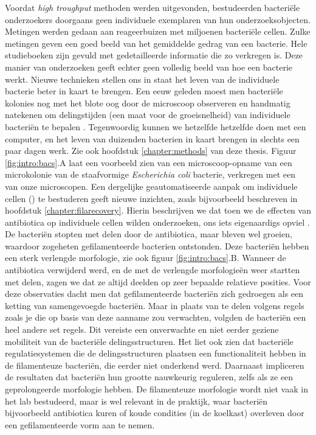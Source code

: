 Voordat \textit{high troughput} methoden werden uitgevonden, 
bestudeerden bacteriële onderzoekers doorgaans geen individuele exemplaren van hun onderzoeksobjecten. 
%
Metingen werden gedaan aan reageerbuizen met miljoenen bacteriële cellen.
%
Zulke metingen geven een goed beeld van het gemiddelde gedrag van een bacterie. 
Hele studieboeken zijn gevuld met gedetailleerde informatie die zo verkregen is.
%
Deze manier van onderzoeken geeft echter geen volledig beeld van hoe een bacterie werkt.
%
Nieuwe technieken stellen ons in staat het leven van de individuele bacterie beter in kaart te brengen.
%
Een eeuw geleden moest men 
bacteriële kolonies nog met het blote oog door de microscoop observeren en 
handmatig 
natekenen
om delingstijden (een maat voor de groeisnelheid) van individuele bacteriën te bepalen \cite{Kelly1932}.
%
Tegenwoordig
kunnen we hetzelfde hetzelfde doen met een computer, 
en het leven van duizenden bacterien in kaart brengen in slechts een paar dagen werk.
Zie ook hoofdstuk \ref{chapter:methods} van deze thesis.
%
Figuur \ref{fig:intro:bacs}.A laat een voorbeeld zien van een microscoop-opname van een microkolonie van de staafvormige \textit{Escherichia coli} bacterie,
verkregen met een van onze microscopen.
%
Een dergelijke geautomatiseerde aanpak 
om individuele cellen () te bestuderen 
geeft nieuwe inzichten,  
%
zoals bijvoorbeeld beschreven in hoofdstuk \ref{chapter:filarecovery}.
%
Hierin beschrijven we dat 
toen we de effecten van antibiotica op individuele cellen wilden onderzoeken, 
ons iets eigenaardigs opviel \cite{RozendaalVerslagXXX}.
%
De bacteriën stopten met delen door de antibiotica, 
maar bleven wel groeien,
waardoor zogeheten gefilamenteerde bacterien ontstonden.
%
Deze bacteriën hebben een sterk verlengde morfologie,
zie ook figuur \ref{fig:intro:bacs}.B.
%
Wanneer de antibiotica verwijderd werd, en de \ecoli met de verlengde morfologieën weer startten met delen, 
zagen we dat ze altijd deelden op zeer bepaalde relatieve posities.
%
Voor deze observaties dacht men dat gefilamenteerde bacteriën zich gedroegen als een ketting van samengevoegde bacteriën.
%
Maar in plaats van te delen volgens regels zoals je die op basis van deze aanname zou verwachten,
volgden de bacteriën een heel andere set regels.
%
Dit vereiste een onverwachte en niet eerder geziene mobiliteit van de bacteriële delingsstructuren.
%
Het liet ook zien dat bacteriële regulatiesystemen die de delingsstructuren plaatsen een functionaliteit hebben in de filamenteuze bacteriën, die eerder niet onderkend werd. 
%
Daarnaast impliceren de resultaten dat bacteriën hun grootte nauwkeurig reguleren, zelfs als ze een geprolongeerde morfologie hebben. 
%
De filamenteuze morfologie wordt niet vaak in het lab bestudeerd, maar is wel relevant in de praktijk, waar bacteriën bijvoorbeeld antibiotica kuren of koude condities (in de koelkast) overleven door een gefilamenteerde vorm aan te nemen.


